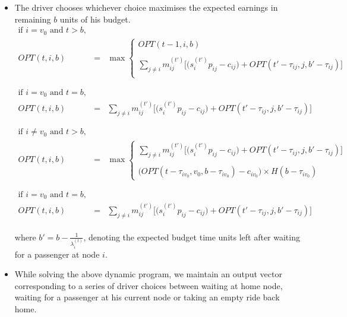 \begin{itemize}
\item The driver chooses whichever choice maximises the expected earnings in remaining $b$ units of his budget. \\
        \begin{eqnarray*}
        \text{if }i=v_0 \text{ and } t>b, \\ 
        OPT(t, i, b) &=& \max
        \begin{cases}
        OPT(t-1, i, b)\\ \\
        \sum\limits_{j\neq i}m_{ij}^{(t')}\bigg[\Big(s_{i}^{(t')} p_{ij} - c_{ij}\Big) + OPT(t'-\tau_{ij},j, b'-\tau_{ij})\bigg] \\
        \end{cases} \\ \\ \\
        \text{if }i=v_0 \text{ and } t=b, \\ 
        OPT(t, i, b) &=& 
        \sum\limits_{j\neq i}m_{ij}^{(t')}\bigg[\Big(s_{i}^{(t')} p_{ij} - c_{ij}\Big) + OPT(t'-\tau_{ij},j, b'-\tau_{ij})\bigg] \\ \\ \\
        \text{if }i\neq v_0 \text{ and } t>b, \\ 
        OPT(t, i, b) &=& \max
        \begin{cases}
        \sum\limits_{j\neq i}m_{ij}^{(t')}\bigg[\Big(s_{i}^{(t')} p_{ij} - c_{ij}\Big) + OPT(t'-\tau_{ij},j, b'-\tau_{ij})\bigg] \\ \\
        \Big(OPT(t-\tau_{iv_0}, v_0, b - \tau_{iv_0}) - c_{iv_0}\Big) \times H(b - \tau_{iv_0})
        \end{cases} \\ \\ \\
        \text{if }i=v_0 \text{ and } t=b, \\ 
        OPT(t, i, b) &=& 
        \sum\limits_{j\neq i}m_{ij}^{(t')}\bigg[\Big(s_{i}^{(t')} p_{ij} - c_{ij}\Big) + OPT(t'-\tau_{ij},j, b'-\tau_{ij})\bigg] \\ \\ \\
        \end{eqnarray*}
where $b' = b - \frac{1}{\lambda_i^{(t)}}$, denoting the expected budget time units left after waiting for a passenger at node $i$.

\item While solving the above dynamic program, we maintain an output vector corresponding to a series of driver choices between waiting at home node, waiting for a passenger at his current node or taking an empty ride back home.
\end{itemize}

